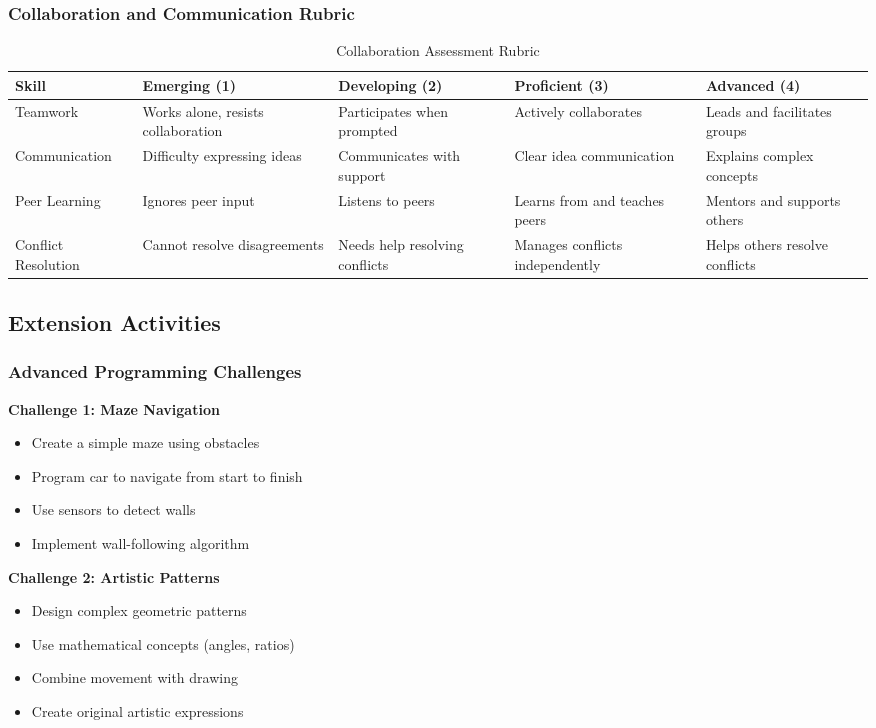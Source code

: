 \subsubsection{Collaboration and Communication Rubric}

\begin{table}[H]
\centering
\caption{Collaboration Assessment Rubric}
\begin{tabular}{|p{3cm}|p{3cm}|p{3cm}|p{3cm}|p{3cm}|}
\hline
\textbf{Skill} & \textbf{Emerging (1)} & \textbf{Developing (2)} & \textbf{Proficient (3)} & \textbf{Advanced (4)} \\
\hline
Teamwork & Works alone, resists collaboration & Participates when prompted & Actively collaborates & Leads and facilitates groups \\
\hline
Communication & Difficulty expressing ideas & Communicates with support & Clear idea communication & Explains complex concepts \\
\hline
Peer Learning & Ignores peer input & Listens to peers & Learns from and teaches peers & Mentors and supports others \\
\hline
Conflict Resolution & Cannot resolve disagreements & Needs help resolving conflicts & Manages conflicts independently & Helps others resolve conflicts \\
\hline
\end{tabular}
\label{tab:collaboration_rubric}
\end{table}

\subsection{Extension Activities}

\subsubsection{Advanced Programming Challenges}

\textbf{Challenge 1: Maze Navigation}
\begin{itemize}
    \item Create a simple maze using obstacles
    \item Program car to navigate from start to finish
    \item Use sensors to detect walls
    \item Implement wall-following algorithm
\end{itemize}

\textbf{Challenge 2: Artistic Patterns}
\begin{itemize}
    \item Design complex geometric patterns
    \item Use mathematical concepts (angles, ratios)
    \item Combine movement with drawing
    \item Create original artistic expressions
\end{itemize}

